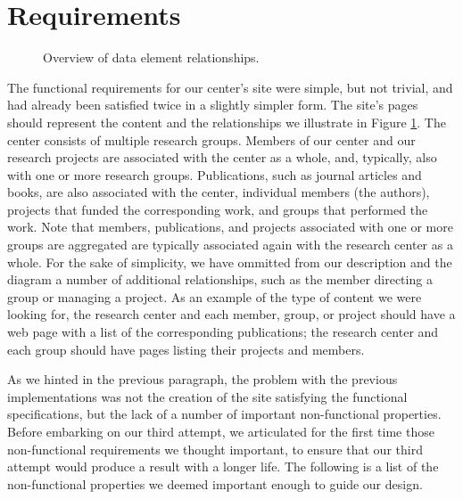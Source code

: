\documentclass[10pt]{article}
\begin{document}
\section{Requirements}
\label{sec:req}
\begin{figure}
\begin{center}
\leavevmode
{}
\end{center}
\caption{
\label{fig:diag}
Overview of data element relationships.}
\end{figure}
The functional requirements for our center's site were
simple, but not trivial, and had already been satisfied
twice in a slightly simpler form.
The site's pages should represent the content and the relationships
we illustrate in Figure \ref{fig:diag}.
The center consists of multiple research groups.
Members of our center and our research projects are
associated with the center as a whole, and, typically, also
with one or more research groups.
Publications, such as journal articles and books,
are also associated with the center, individual members (the authors),
projects that funded the corresponding work,
and groups that performed the work.
Note that members, publications, and projects associated
with one or more groups are aggregated are typically associated
again with the research center as a whole.
For the sake of simplicity,
we have ommitted from our description and the diagram
a number of additional relationships,
such as the member directing a group or managing a project.
As an example of the type of content we were looking for,
the research center and
each member, group, or project should have a web page with a list
of the corresponding publications;
the research center and each group should have pages listing
their projects and members.

As we hinted in the previous paragraph, the problem with
the previous implementations was not the creation of the site
satisfying the functional specifications,
but the lack of a number of important non-functional properties.
Before embarking on our third attempt,
we articulated for the first time those non-functional requirements
we thought important, to ensure that our third attempt would produce
a result with a longer life.
The following is a list of the non-functional properties
we deemed important enough to guide our design.
\end{document}

